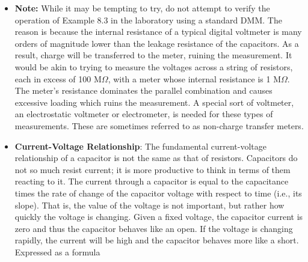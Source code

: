 \documentclass{report}
\begin{document}
\begin{itemize}
            \bigbreak \noindent 
            Finally, the individual voltages are computed from
            \begin{align*}
                V = \frac{Q}{C}
            .\end{align*}
            Consider
            \bigbreak \noindent 
            \bigbreak \noindent 
            We have
            \begin{align*}
                C_{\text{total}} &= \frac{1}{\frac{1}{C_{1}} + \frac{1}{C_{2}} + \frac{1}{C_{3}}} =1.143\mu F
            .\end{align*}
            Hence,
            \begin{align*}
                Q = VC = 12V (1.143)\mu F = 13.71\mu C
            .\end{align*}
            Charge is constant across all of the series capacitors, so
            \begin{align*}
                V_{2\mu F} &= \frac{13.71}{2} = 6.855V, \\
                V_{4\mu F} &= \frac{13.71}{4} = 3.427V, \\
                V_{8\mu F} &= \frac{13.71}{8} = 1.714V
            .\end{align*}
            The sum of the three voltages is 12 volts (within rounding error) and verifies KVL as expected.
        \item \textbf{Note:} While it may be tempting to try, do not attempt to verify the operation of Example 8.3 in the laboratory using a standard DMM. The reason is because the internal resistance of a typical digital voltmeter is many orders of magnitude lower than the leakage resistance of the capacitors. As a result, charge will be transferred to the meter, ruining the measurement. It would be akin to trying to measure the voltages across a string of resistors, each in excess of 100 M$\Omega$, with a meter whose internal resistance is 1 M$\Omega$. The meter's resistance dominates the parallel combination and causes excessive loading which ruins the measurement. A special sort of voltmeter, an electrostatic voltmeter or electrometer, is needed for these types of measurements. These are sometimes referred to as non-charge transfer meters.
        \item \textbf{Current-Voltage Relationship}: The fundamental current-voltage relationship of a capacitor is not the same as that of resistors. Capacitors do not so much resist current; it is more productive to think in terms of them reacting to it. The current through a capacitor is equal to the capacitance times the rate of change of the capacitor voltage with respect to time (i.e., its slope). That is, the value of the voltage is not important, but rather how quickly the voltage is changing. Given a fixed voltage, the capacitor current is zero and thus the capacitor behaves like an open. If the voltage is changing rapidly, the current will be high and the capacitor behaves more like a short. Expressed as a formula

\end{itemize}
\end{document}
